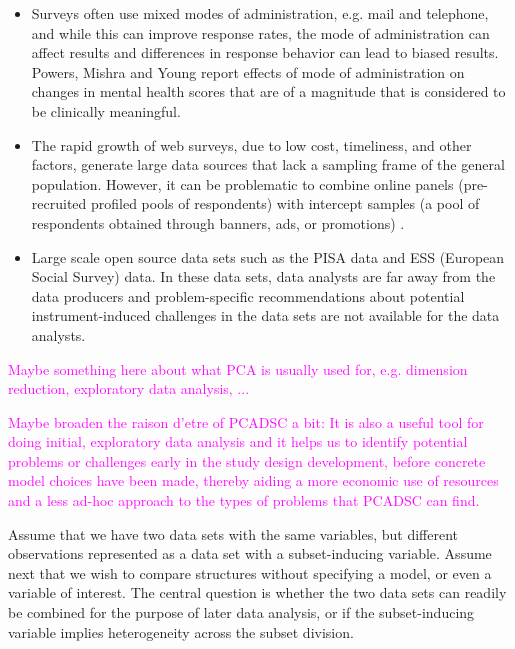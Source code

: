 \documentclass[titlepage,11pt,twoside]{article}
\newcommand{\hl}[1]{\textcolor{magenta}{#1}}
\begin{document}
\begin{itemize}
\item Surveys often use mixed modes of administration, e.g. mail and telephone, and while this can improve response rates, the mode of administration can affect results \cite{Brambilla1987,McHorney1994} and differences in response behavior can lead to biased results. Powers, Mishra and Young \citeyearpar{Powers2005} report effects of mode of administration on changes in mental health scores that are of a magnitude that is considered to be clinically meaningful.
\item The rapid growth of web surveys, due to low cost, timeliness, and other factors, generate large data sources that lack a sampling frame of the general population. However, it can be problematic to combine online panels (pre-recruited profiled pools of respondents) with intercept samples (a pool of respondents obtained through banners, ads, or promotions) \cite{Liu2016}.
\item Large scale open source data sets such as the PISA data and ESS (European Social Survey) data. In these data sets, data analysts are far away from the data producers and problem-specific recommendations about potential instrument-induced challenges in the data sets are not available for the data analysts.
\end{itemize}

\hl{Maybe something here about what PCA is usually used for, e.g. dimension reduction, exploratory data analysis, ...}


\hl{Maybe broaden the raison d'etre of PCADSC a bit: It is also a useful tool for doing initial, exploratory data analysis and it helps us to identify potential problems or challenges early in the study design development, before concrete model choices have been made, thereby aiding a more economic use of resources and a less ad-hoc approach to the types of problems that PCADSC can find.}

Assume that we have two data sets with the same variables, but different observations represented as a data set with
a subset-inducing variable. Assume next that we wish to compare structures without specifying a model, or even a variable of interest. The central question is whether the two data sets can readily be combined for the purpose of later data analysis, or if the subset-inducing variable implies heterogeneity across the subset division.
\end{document}
